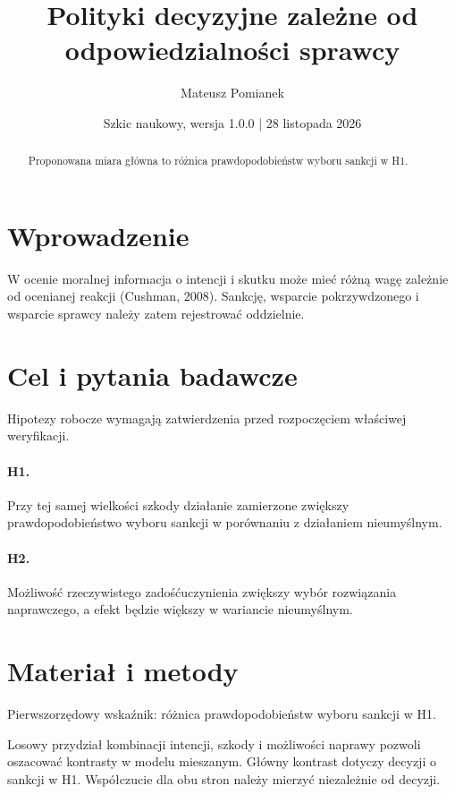 \documentclass[11pt,a4paper]{article}
\title{Polityki decyzyjne zależne od odpowiedzialności sprawcy}
\author{Mateusz Pomianek}
\date{Szkic naukowy, wersja 1.0.0 | 28 listopada 2026}
\begin{document}
\maketitle

\begin{abstract}

Proponowana miara główna to różnica prawdopodobieństw wyboru sankcji w H1.

\end{abstract}

\section{Wprowadzenie}

W ocenie moralnej informacja o intencji i skutku może mieć różną wagę zależnie od ocenianej reakcji (Cushman, 2008). Sankcję, wsparcie pokrzywdzonego i wsparcie sprawcy należy zatem rejestrować oddzielnie.

\section{Cel i pytania badawcze}

Hipotezy robocze wymagają zatwierdzenia przed rozpoczęciem właściwej weryfikacji.

\paragraph{H1.} Przy tej samej wielkości szkody działanie zamierzone zwiększy prawdopodobieństwo wyboru sankcji w porównaniu z działaniem nieumyślnym.

\paragraph{H2.} Możliwość rzeczywistego zadośćuczynienia zwiększy wybór rozwiązania naprawczego, a efekt będzie większy w wariancie nieumyślnym.

\section{Materiał i metody}

Pierwszorzędowy wskaźnik: różnica prawdopodobieństw wyboru sankcji w H1.

Losowy przydział kombinacji intencji, szkody i możliwości naprawy pozwoli oszacować kontrasty w modelu mieszanym. Główny kontrast dotyczy decyzji o sankcji w H1. Współczucie dla obu stron należy mierzyć niezależnie od decyzji.
\end{document}

